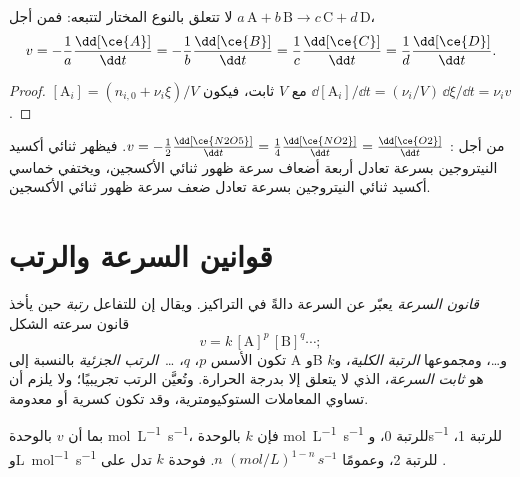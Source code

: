\begin{proposition}\label{prop:b1:rate-laws:rate-relations}
لا تتعلق  بالنوع المختار لتتبعه:
فمن أجل $a\,\mathrm{A} + b\,\mathrm{B} \longrightarrow c\,\mathrm{C} + d\,\mathrm{D}$،
\[
  v = -\frac1a\frac{\dd[\ce{A}]}{\dd t} = -\frac1b\frac{\dd[\ce{B}]}{\dd t}
  = \frac1c\frac{\dd[\ce{C}]}{\dd t} = \frac1d\frac{\dd[\ce{D}]}{\dd t} .
\]
\end{proposition}

\begin{proof}
$[\mathrm{A}_i] = (n_{i,0} + \nu_i\xi)/V$ مع $V$ ثابت، فيكون
$\dd[\mathrm{A}_i]/\dd t = (\nu_i/V)\,\dd\xi/\dd t = \nu_i v$.
\end{proof}

\begin{example}\label{ex:b1:rate-laws:n2o5}
من أجل : $v = -\frac12\frac{\dd[\ce{N2O5}]}{\dd t} =
\frac14\frac{\dd[\ce{NO2}]}{\dd t} = \frac{\dd[\ce{O2}]}{\dd t}$. فيظهر ثنائي أكسيد
النيتروجين بسرعة تعادل أربعة أضعاف سرعة ظهور ثنائي الأكسجين، ويختفي خماسي أكسيد ثنائي النيتروجين
بسرعة تعادل ضعف سرعة ظهور ثنائي الأكسجين.
\end{example}

\section{قوانين السرعة والرتب}

\begin{definition}\label{def:b1:rate-laws:order}
\emph{قانون السرعة} يعبّر عن السرعة دالةً في
التراكيز. ويقال إن للتفاعل \emph{رتبة} حين يأخذ قانون سرعته
الشكل
\[
  v = k\,[\mathrm{A}]^{p}\,[\mathrm{B}]^{q} \cdots ;
\]
تكون الأسس $p$، $q$، \dots\ \emph{الرتب الجزئية}
بالنسبة إلى A وB و\dots، ومجموعها \emph{الرتبة
الكلية}، و$k$ هو \emph{ثابت السرعة}،
الذي لا يتعلق إلا بدرجة الحرارة. وتُعيَّن الرتب
تجريبيًا؛ ولا يلزم أن تساوي المعاملات الستوكيومترية، وقد
تكون كسرية أو معدومة.
\end{definition}

\begin{remark}[وحدات $k$]\label{rem:b1:rate-laws:units}
بما أن $v$ بالوحدة \unit{mol.L^{-1}.s^{-1}}، فإن $k$ بالوحدة
\unit{mol.L^{-1}.s^{-1}} للرتبة 0، و\unit{s^{-1}} للرتبة 1،
و\unit{L.mol^{-1}.s^{-1}} للرتبة 2، وعمومًا
$(\unit{mol/L})^{1-n}\,\unit{s^{-1}}$  $n$. فوحدة
$k$ تدل على .
\end{remark}

